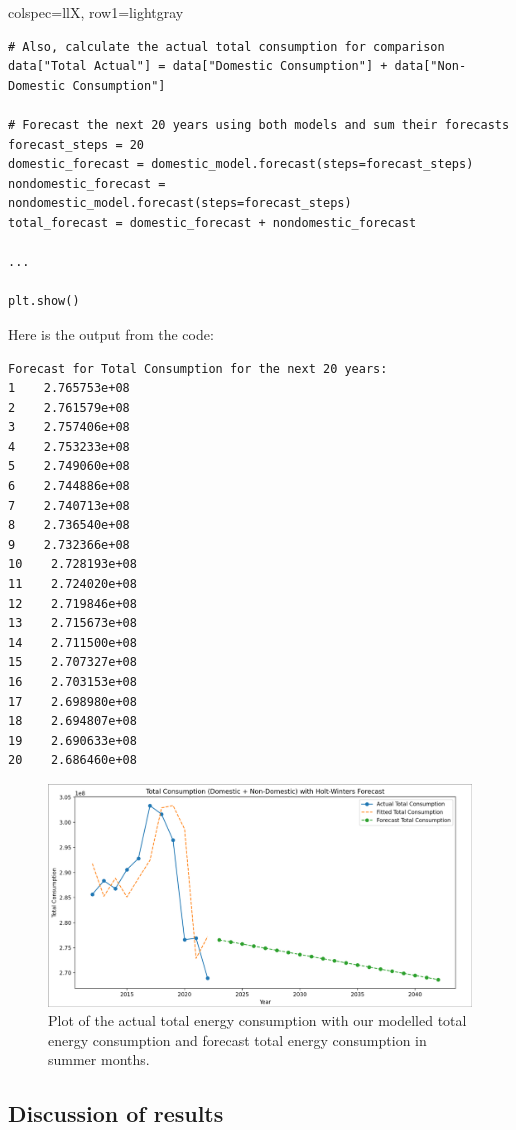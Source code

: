 \documentclass[11pt]{article}
\begin{document}
\begin{longtblr}[
  caption={Variables and parameters.}
]{
  colspec={llX},
  row{1}={lightgray}
}
\begin{verbatim}
# Also, calculate the actual total consumption for comparison
data["Total Actual"] = data["Domestic Consumption"] + data["Non-Domestic Consumption"]

# Forecast the next 20 years using both models and sum their forecasts
forecast_steps = 20
domestic_forecast = domestic_model.forecast(steps=forecast_steps)
nondomestic_forecast = nondomestic_model.forecast(steps=forecast_steps)
total_forecast = domestic_forecast + nondomestic_forecast

...

plt.show()
\end{verbatim}

Here is the output from the code:

\begin{verbatim}
Forecast for Total Consumption for the next 20 years:
1    2.765753e+08
2    2.761579e+08
3    2.757406e+08
4    2.753233e+08
5    2.749060e+08
6    2.744886e+08
7    2.740713e+08
8    2.736540e+08
9    2.732366e+08
10    2.728193e+08
11    2.724020e+08
12    2.719846e+08
13    2.715673e+08
14    2.711500e+08
15    2.707327e+08
16    2.703153e+08
17    2.698980e+08
18    2.694807e+08
19    2.690633e+08
20    2.686460e+08
\end{verbatim}

\begin{center}
\begin{figure}[H]
  \centering
  \includegraphics[scale=0.25]{Images/Q2.png}
  \caption{Plot of the actual total energy consumption with our modelled total energy consumption and forecast total energy
  consumption in summer months.}
\end{figure}
\end{center}

\subsection{Discussion of results}


\end{longtblr}
\end{document}
